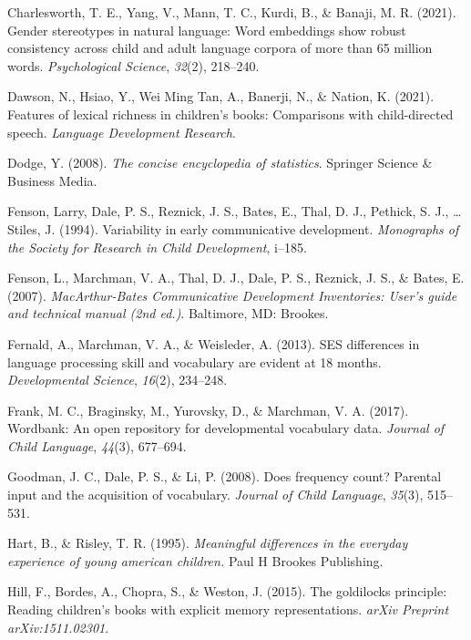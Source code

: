 \documentclass[10pt, letterpaper]{article}
\newenvironment{CSLReferences}%
  {}%
  {\par}
\begin{document}
\begin{CSLReferences}{1}{0}
\leavevmode\hypertarget{ref-charlesworth2021gender}{}%
Charlesworth, T. E., Yang, V., Mann, T. C., Kurdi, B., \& Banaji, M. R.
(2021). Gender stereotypes in natural language: Word embeddings show
robust consistency across child and adult language corpora of more than
65 million words. \emph{Psychological Science}, \emph{32}(2), 218--240.

\leavevmode\hypertarget{ref-dawson2021features}{}%
Dawson, N., Hsiao, Y., Wei Ming Tan, A., Banerji, N., \& Nation, K.
(2021). Features of lexical richness in children's books: Comparisons
with child-directed speech. \emph{Language Development Research}.

\leavevmode\hypertarget{ref-dodge2008concise}{}%
Dodge, Y. (2008). \emph{The concise encyclopedia of statistics}.
Springer Science \& Business Media.

\leavevmode\hypertarget{ref-fenson1994variability}{}%
Fenson, Larry, Dale, P. S., Reznick, J. S., Bates, E., Thal, D. J.,
Pethick, S. J., \ldots{} Stiles, J. (1994). Variability in early
communicative development. \emph{Monographs of the Society for Research
in Child Development}, i--185.

\leavevmode\hypertarget{ref-fenson2007}{}%
Fenson, L., Marchman, V. A., Thal, D. J., Dale, P. S., Reznick, J. S.,
\& Bates, E. (2007). \emph{{M}ac{A}rthur-{B}ates {C}ommunicative
{D}evelopment {I}nventories: User's guide and technical manual (2nd
ed.)}. Baltimore, MD: Brookes.

\leavevmode\hypertarget{ref-fernald2013ses}{}%
Fernald, A., Marchman, V. A., \& Weisleder, A. (2013). SES differences
in language processing skill and vocabulary are evident at 18 months.
\emph{Developmental Science}, \emph{16}(2), 234--248.

\leavevmode\hypertarget{ref-frank2017wordbank}{}%
Frank, M. C., Braginsky, M., Yurovsky, D., \& Marchman, V. A. (2017).
Wordbank: An open repository for developmental vocabulary data.
\emph{Journal of Child Language}, \emph{44}(3), 677--694.

\leavevmode\hypertarget{ref-goodman2008}{}%
Goodman, J. C., Dale, P. S., \& Li, P. (2008). Does frequency count?
Parental input and the acquisition of vocabulary. \emph{Journal of Child
Language}, \emph{35}(3), 515--531.

\leavevmode\hypertarget{ref-hart1995meaningful}{}%
Hart, B., \& Risley, T. R. (1995). \emph{Meaningful differences in the
everyday experience of young american children.} Paul H Brookes
Publishing.

\leavevmode\hypertarget{ref-hill2015goldilocks}{}%
Hill, F., Bordes, A., Chopra, S., \& Weston, J. (2015). The goldilocks
principle: Reading children's books with explicit memory
representations. \emph{arXiv Preprint arXiv:1511.02301}.


\end{CSLReferences}
\end{document}
